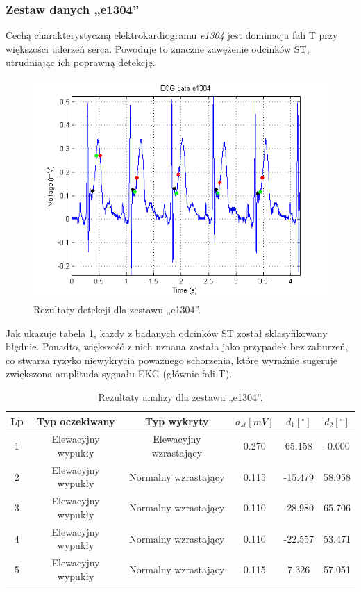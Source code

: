 \subsubsection*{Zestaw danych „e1304”}
Cechą charakterystyczną elektrokardiogramu \emph{e1304} jest dominacja fali T przy większości uderzeń serca. Powoduje to znaczne zawężenie odcinków ST, utrudniając ich poprawną detekcję.
\begin{figure}[H]
	\centering
	\includegraphics[width=1\textwidth]{ST_INTERVAL/img/ST_zestawE1304.png}
	\caption{Rezultaty detekcji dla zestawu „e1304”.}
	\label{fig:ST_zestawE1304}
\end{figure}
Jak ukazuje tabela \ref{tab:ST_zestawE1304}, każdy z badanych odcinków ST został sklasyfikowany błędnie. Ponadto, większość z nich uznana została jako przypadek bez zaburzeń, co stwarza ryzyko niewykrycia poważnego schorzenia, które wyraźnie sugeruje zwiększona amplituda sygnału EKG (głównie fali T).
\begin{table}[H]
	\centering
	\caption{Rezultaty analizy dla zestawu „e1304”.}
	\label{tab:ST_zestawE1304}
	\begin{tabular}{|c|c|c|c|c|c|}
	\hline
	Lp & Typ oczekiwany & Typ wykryty & $ a_{st} [mV] $ & $ d_1 [^\circ] $ & $ d_2 [^\circ] $ \\ \hline
	1	&	Elewacyjny wypukły	&	Elewacyjny wzrastający	&	0.270	&	65.158	&	-0.000 \\ \hline
	2	&	Elewacyjny wypukły	&	Normalny wzrastający	&	0.115	&	-15.479	&	58.958 \\ \hline
	3	&	Elewacyjny wypukły	&	Normalny wzrastający	&	0.110	&	-28.980	&	65.706 \\ \hline
	4	&	Elewacyjny wypukły	&	Normalny wzrastający	&	0.110	&	-22.557	&	53.471 \\ \hline
	5	&	Elewacyjny wypukły	&	Normalny wzrastający	&	0.115	&	7.326	&	57.051 \\ \hline
	\end{tabular}
\end{table}

